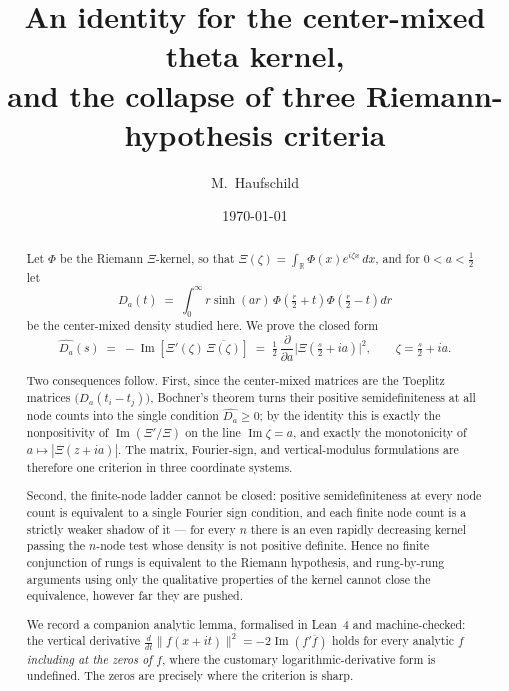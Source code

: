 \documentclass[11pt,a4paper]{amsart}
\theoremstyle{plain}
\theoremstyle{definition}
\newcommand{\RR}{\mathbb{R}}
\newcommand{\Xii}{\Xi}
\begin{document}
\title[The center-mixed kernel and three RH criteria]{An identity for the center-mixed theta kernel,\\
and the collapse of three Riemann-hypothesis criteria}

\author{M.~Haufschild}
\address{Independent researcher}

\date{\today}


\begin{abstract}
Let $\Phi$ be the Riemann $\Xii$-kernel, so that $\Xii(\zeta)=\int_\RR\Phi(x)e^{i\zeta x}\,dx$, and
for $0<a<\tfrac12$ let
\[
  D_a(t)\;=\;\int_0^\infty r\sinh(ar)\,\Phi\!\left(\tfrac r2+t\right)\Phi\!\left(\tfrac r2-t\right)dr
\]
be the center-mixed density studied here. We prove the closed
form
\[
  \widehat{D_a}(s)\;=\;-\operatorname{Im}\!\left[\Xii'(\zeta)\,\overline{\Xii(\zeta)}\right]
  \;=\;\tfrac12\,\frac{\partial}{\partial a}\bigl|\Xii(\tfrac s2+ia)\bigr|^2,
  \qquad \zeta=\tfrac s2+ia .
\]

Two consequences follow. First, since the center-mixed matrices are the Toeplitz matrices
$\bigl(D_a(t_i-t_j)\bigr)$, Bochner's theorem turns their positive semidefiniteness at all node
counts into the single condition $\widehat{D_a}\ge0$; by the identity this is exactly the
nonpositivity of $\operatorname{Im}(\Xii'/\Xii)$ on the line $\operatorname{Im}\zeta=a$, and exactly
the monotonicity of $a\mapsto|\Xii(z+ia)|$. The matrix, Fourier-sign, and vertical-modulus
formulations are therefore one criterion in three coordinate systems.

Second, the finite-node ladder cannot be closed: positive semidefiniteness at every node count is
equivalent to a single Fourier sign condition, and each finite node count is a strictly weaker
shadow of it --- for every $n$ there is an even rapidly decreasing kernel passing the $n$-node test
whose density is not positive definite. Hence no finite conjunction of rungs is equivalent to the
Riemann hypothesis, and rung-by-rung arguments using only the qualitative properties of the kernel
cannot close the equivalence, however far they are pushed.

We record a companion analytic lemma, formalised in Lean~4 and machine-checked: the vertical
derivative $\frac{d}{dt}\|f(x+it)\|^2=-2\operatorname{Im}(f'\overline f)$ holds for every analytic
$f$ \emph{including at the zeros of $f$}, where the customary logarithmic-derivative form is
undefined. The zeros are precisely where the criterion is sharp.
\end{abstract}
\end{document}
